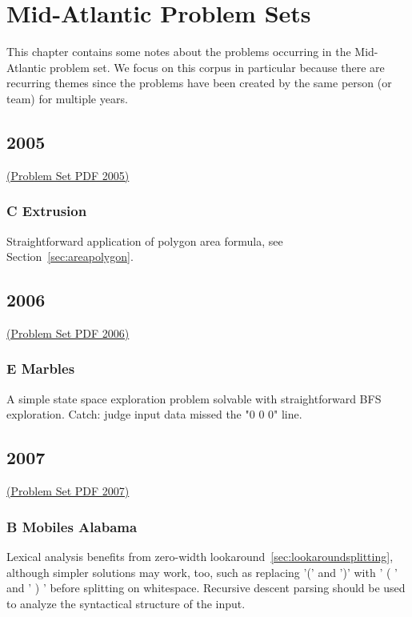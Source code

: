 \chapter{Mid-Atlantic Problem Sets}

This chapter contains some notes about the problems occurring in the Mid-Atlantic
problem set.  We focus on this corpus in particular because there are recurring
themes since the problems have been created by the same person (or team) for
multiple years.

\section{2005}

\href{http://midatl.radford.edu/docs/pastProblems/05contest/MidAtlantic2005.pdf}{(Problem Set PDF 2005)}

\subsection{C Extrusion}
\label{sec:2005-c-extrusion}

Straightforward application of polygon area formula, see Section~\ref{sec:areapolygon}.

\section{2006}
\href{http://midatl.radford.edu/docs/pastProblems/06contest/MidAtlantic2006.pdf}{(Problem Set PDF 2006)}

\subsection{E Marbles}
\label{sec:2006-e-marbles}
A simple state space exploration problem solvable with straightforward BFS exploration.
Catch: judge input data missed the "0 0 0" line.

\section{2007}
\href{http://midatl.radford.edu/docs/pastProblems/07contest/MidAtlantic2007.pdf}{(Problem Set PDF 2007)}

\subsection{B Mobiles Alabama}
\label{sec:2007-b-mobile}

Lexical analysis benefits from zero-width lookaround~\ref{sec:lookaroundsplitting}, although
simpler solutions may work, too, such as replacing '(' and ')' with ' ( ' and ' ) ' before 
splitting on whitespace.
Recursive descent parsing should be used to analyze the syntactical structure of the input.

